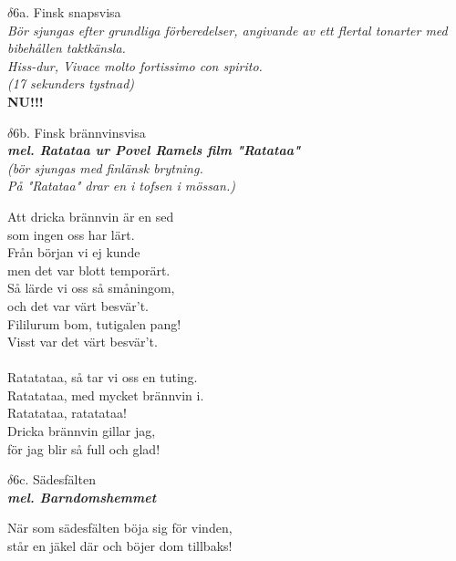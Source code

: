 \documentclass[a6paper,10pt]{article}
\newcommand{\mel}[1]{\small\textbf{\textit{mel. #1 \\}}}
\begin{document}
\setlength{\oddsidemargin}{-0.47in}
\noindent
\begin{center}
\Large $\delta6$a. Finsk snapsvisa\\ 
\textit{\small Bör sjungas efter grundliga förberedelser, angivande av ett flertal tonarter med bibehållen taktkänsla.\\ Hiss-dur, Vivace molto fortissimo con spirito.\\
(17 sekunders tystnad)}\\
\Large \textbf{NU!!!}
\end{center}
\begin{center}
\Large $\delta6$b. Finsk brännvinsvisa\\ 
\mel{Ratataa ur Povel Ramels film "Ratataa"}
\textit{\small (bör sjungas med finlänsk brytning. \\ På "Ratataa" drar en i tofsen i mössan.)}
\end{center}
Att dricka brännvin är en sed \\
som ingen oss har lärt. \\
Från början vi ej kunde \\
men det var blott temporärt. \\
Så lärde vi oss så småningom, \\
och det var värt besvär't. \\
Fililurum bom, tutigalen pang! \\
Visst var det värt besvär't. \\
\vspace{5pt}\\
Ratatataa, så tar vi oss en tuting. \\
Ratatataa, med mycket brännvin i. \\
Ratatataa, ratatataa! \\
Dricka brännvin gillar jag, \\
för jag blir så full och glad! 
\begin{center}
\Large $\delta6$c. Sädesfälten\\ 
\mel{Barndomshemmet}
\end{center}
När som sädesfälten böja sig för vinden, \\
står en jäkel där och böjer dom tillbaks! 
\end{document}
